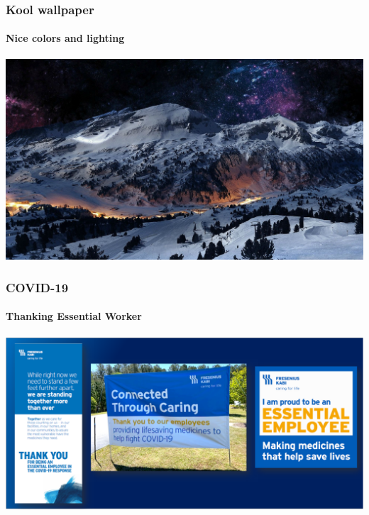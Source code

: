 \documentclass{beamer}
\begin{document}
\begin{frame}
  \frametitle{\hspace{4mm}Kool wallpaper}%
  \framesubtitle{\hspace{4mm}Nice colors and lighting}%
  \includegraphics[scale=.16]{images/cid-03.png}%
\end{frame}%

\begin{frame}
  \frametitle{\hspace{4mm}COVID-19}%
  \framesubtitle{\hspace{4mm}Thanking Essential Worker}%
  \includegraphics[scale=.38]{images/cid-04.png}%
\end{frame}%

\end{document}
